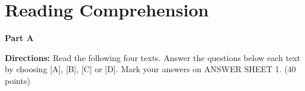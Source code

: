 \section{Reading Comprehension}

\textbf{Part A}

\textbf{Directions:}
Read the following four texts. Answer the questions below each text by choosing [A], [B], [C] or [D]. Mark your answers on ANSWER SHEET 1. (40 points)

\vspace{6pt}